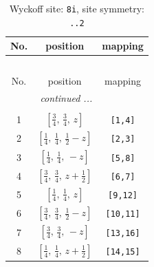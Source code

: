 \documentclass[fleqn,8pt]{jsarticle}
\begin{document}
\begin{longtable}{ccc}
\caption{Wyckoff site: {\tt 8i}, site symmetry: {\tt ..2}}
 \\
 \hline \hline
No. & position & mapping \\ \hline \endfirsthead

\multicolumn{2}{l}{\tablename\ \thetable{}} \\
 \hline \hline
No. & position & mapping \\ \hline \endhead

 \hline \hline
\multicolumn{2}{r}{\footnotesize\it continued ...} \\ \endfoot

 \hline \hline
\multicolumn{2}{r}{} \\ \endlastfoot

1 & $\left[ \frac{3}{4},\, \frac{3}{4},\, z \right]$ & {\tt [1,4]} \\ \hline
2 & $\left[ \frac{1}{4},\, \frac{1}{4},\, \frac{1}{2} - z \right]$ & {\tt [2,3]} \\ \hline
3 & $\left[ \frac{1}{4},\, \frac{1}{4},\, - z \right]$ & {\tt [5,8]} \\ \hline
4 & $\left[ \frac{3}{4},\, \frac{3}{4},\, z + \frac{1}{2} \right]$ & {\tt [6,7]} \\ \hline
5 & $\left[ \frac{1}{4},\, \frac{1}{4},\, z \right]$ & {\tt [9,12]} \\ \hline
6 & $\left[ \frac{3}{4},\, \frac{3}{4},\, \frac{1}{2} - z \right]$ & {\tt [10,11]} \\ \hline
7 & $\left[ \frac{3}{4},\, \frac{3}{4},\, - z \right]$ & {\tt [13,16]} \\ \hline
8 & $\left[ \frac{1}{4},\, \frac{1}{4},\, z + \frac{1}{2} \right]$ & {\tt [14,15]} \\
\end{longtable}
\renewcommand{\arraystretch}{1.2}
\end{document}
